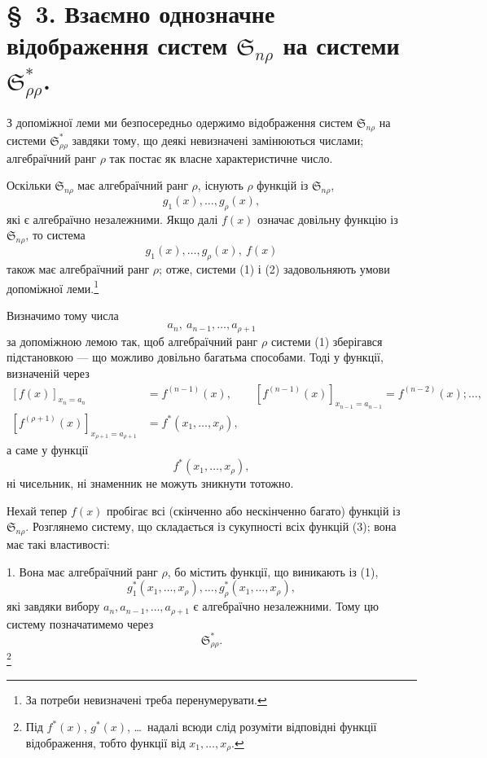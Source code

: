 \documentclass[11pt]{article}
\providecommand{\Ssys}{\mathfrak{S}}
\begin{document}
\section*{\S\ 3. Взаємно однозначне відображення систем $\Ssys_{n\rho}$ на системи $\Ssys^*_{\rho\rho}$.}

З допоміжної леми ми безпосередньо одержимо відображення систем $\Ssys_{n\rho}$ на системи $\Ssys^*_{\rho\rho}$ завдяки тому, що деякі невизначені замінюються числами; алгебраїчний ранг $\rho$ так постає як власне характеристичне число.

Оскільки $\Ssys_{n\rho}$ має алгебраїчний ранг $\rho$, існують $\rho$ функцій із $\Ssys_{n\rho}$,
\begin{equation}
  g_1(x),\ldots,g_\rho(x),
\tag{1}
\end{equation}
які є алгебраїчно незалежними. Якщо далі $f(x)$ означає довільну функцію із $\Ssys_{n\rho}$, то система
\begin{equation}
  g_1(x),\ldots,g_\rho(x),\ f(x)
\tag{2}
\end{equation}
також має алгебраїчний ранг $\rho$; отже, системи (1) і (2) задовольняють умови допоміжної леми.\footnote{За потреби невизначені треба перенумерувати.}

Визначимо тому числа
\[
  a_n,\ a_{n-1},\ldots,a_{\rho+1}
\]
за допоміжною лемою так, щоб алгебраїчний ранг $\rho$ системи (1) зберігався підстановкою --- що можливо довільно багатьма способами. Тоді у функції, визначеній через
\[
\begin{aligned}
 [f(x)]_{x_n=a_n}&=f^{(n-1)}(x),\qquad
 [f^{(n-1)}(x)]_{x_{n-1}=a_{n-1}}=f^{(n-2)}(x);\ldots,\\
 [f^{(\rho+1)}(x)]_{x_{\rho+1}=a_{\rho+1}}&=f^*(x_1,
\ldots,x_\rho),
\end{aligned}
\]
а саме у функції
\begin{equation}
  f^*(x_1,\ldots,x_\rho),
\tag{3}
\end{equation}
ні чисельник, ні знаменник не можуть зникнути тотожно.

Нехай тепер $f(x)$ пробігає всі (скінченно або нескінченно багато) функцій із $\Ssys_{n\rho}$. Розглянемо систему, що складається із сукупності всіх функцій (3); вона має такі властивості:

1. Вона має алгебраїчний ранг $\rho$, бо містить функції, що виникають із (1),
\[
  g_1^*(x_1,
\ldots,x_\rho),\ldots,g_\rho^*(x_1,\ldots,x_\rho),
\]
які завдяки вибору $a_n,a_{n-1},\ldots,a_{\rho+1}$ є алгебраїчно незалежними. Тому цю систему позначатимемо через
\[
  \Ssys^*_{\rho\rho}.
\]
\footnote{Під $f^*(x)$, $g^*(x)$, \ldots\ надалі всюди слід розуміти відповідні функції відображення, тобто функції від $x_1,\ldots,x_\rho$.}
\end{document}
